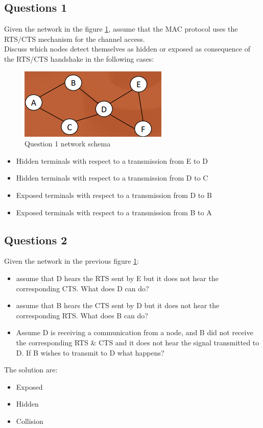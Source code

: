 \subsection{Questions 1}
Given the network in the figure \ref{wn-q1}, assume that the MAC protocol uses the RTS/CTS mechanism for the channel access.\\
Discuss which nodes detect themselves as hidden or exposed as
consequence of the RTS/CTS handshake in the following cases:
\begin{figure}[h!]
	\centering
	\includegraphics[scale=0.50]{images/Pasted image 20230531110613.png}
	\caption{Question 1 network schema}
	\label{wn-q1}
\end{figure}
\begin{itemize}
	\item Hidden terminals with respect to a transmission from E to D
	\item Hidden terminals with respect to a transmission from D to C
	\item Exposed terminals with respect to a transmission from D to B
	\item Exposed terminals with respect to a transmission from B to A
\end{itemize}



\subsection{Questions 2}\label{sec:questions-2}
Given the network in the previous figure \ref{wn-q1}:
\begin{itemize}
	\item assume that D hears the RTS sent by E but it does not hear the
	corresponding CTS. What does D can do?
	\item assume that B hears the CTS sent by D but it does not hear the
	corresponding RTS. What does B can do?
	\item Assume D is receiving a communication from a node, and B
	did not receive the corresponding RTS \& CTS and it does not
	hear the signal transmitted to D. If B wishes to transmit to D
	what happens?
\end{itemize}
The solution are:
\begin{itemize}
	\item 
	Exposed
	\item 
	Hidden
	\item 
	Collision
\end{itemize}


